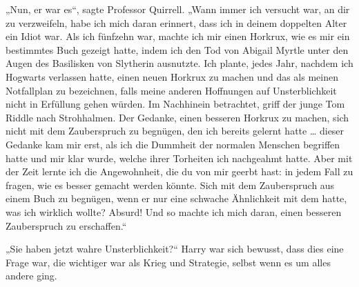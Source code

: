 „Nun, er war es“, sagte Professor Quirrell.
„Wann immer ich versucht war, an dir zu verzweifeln, habe ich mich daran erinnert, dass ich in deinem doppelten Alter ein Idiot war. Als ich fünfzehn war, machte ich mir einen Horkrux, wie es mir ein bestimmtes Buch gezeigt hatte, indem ich den Tod von Abigail Myrtle unter den Augen des Basilisken von Slytherin ausnutzte. Ich plante, jedes Jahr, nachdem ich Hogwarts verlassen hatte, einen neuen Horkrux zu machen und das als meinen Notfallplan zu bezeichnen, falls meine anderen Hoffnungen auf Unsterblichkeit nicht in Erfüllung gehen würden. Im Nachhinein betrachtet, griff der junge Tom Riddle nach Strohhalmen. Der Gedanke, einen besseren Horkrux zu machen, sich nicht mit dem Zauberspruch zu begnügen, den ich bereits gelernt hatte … dieser Gedanke kam mir erst, als ich die Dummheit der normalen Menschen begriffen hatte und mir klar wurde, welche ihrer Torheiten ich nachgeahmt hatte. Aber mit der Zeit lernte ich die Angewohnheit, die du von mir geerbt hast: in jedem Fall zu fragen, wie es besser gemacht werden könnte. Sich mit dem Zauberspruch aus einem Buch zu begnügen, wenn er nur eine schwache Ähnlichkeit mit dem hatte, was ich wirklich wollte? Absurd! Und so machte ich mich daran, einen besseren Zauberspruch zu erschaffen.“

„Sie haben jetzt wahre Unsterblichkeit?“
Harry war sich bewusst, dass dies eine Frage war, die wichtiger war als Krieg und Strategie, selbst wenn es um alles andere ging.


